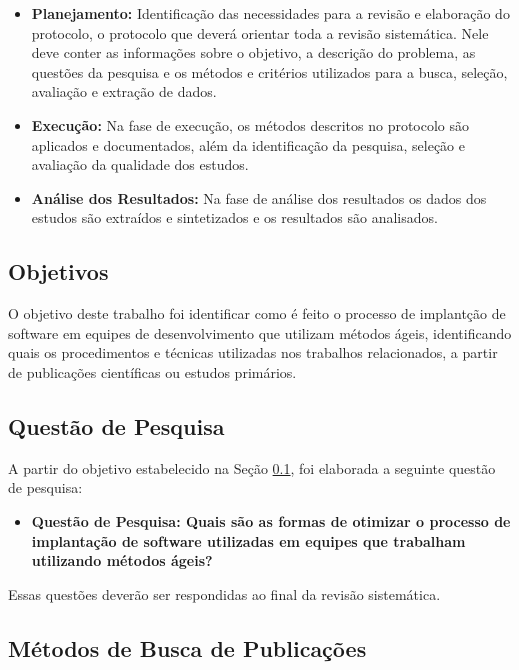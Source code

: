 \documentclass[12pt]{article}
\begin{document}
 \begin{itemize}
   \item  \textbf{Planejamento: } Identificação  das  necessidades  para  a  revisão  e  elaboração do protocolo, o protocolo que deverá orientar toda a revisão sistemática. Nele deve conter as informações sobre o objetivo, a descrição do problema, as questões
da pesquisa e os métodos e critérios utilizados para a busca, seleção, avaliação e extração de dados.
   \item  \textbf{Execução: } Na fase de execução, os métodos descritos no protocolo são aplicados e documentados, além da identificação da pesquisa, seleção e avaliação da qualidade  dos  estudos.
      \item  \textbf{Análise dos Resultados: }Na fase de análise dos resultados os dados dos estudos são extraídos e sintetizados e os
resultados são analisados.
 \end{itemize}

\subsection{Objetivos} \label{sec3:subsec1}

O objetivo deste trabalho foi identificar como é feito o processo de implantção de software em equipes de desenvolvimento que utilizam métodos ágeis, identificando quais os procedimentos e técnicas utilizadas nos trabalhos relacionados, a partir de publicações científicas ou estudos primários.

\subsection{Questão de Pesquisa} \label{sec3:subsec2}

A partir do objetivo estabelecido na Seção \ref{sec3:subsec1}, foi elaborada a seguinte questão de pesquisa:

 \begin{itemize}
   \item  \textbf{Questão de Pesquisa: Quais são as formas de otimizar o processo de implantação de software utilizadas em equipes que trabalham utilizando métodos ágeis? }
 \end{itemize}

Essas questões deverão ser respondidas ao final da revisão sistemática.

\subsection{Métodos de Busca de Publicações} \label{sec3:subsec3}
\end{document}
